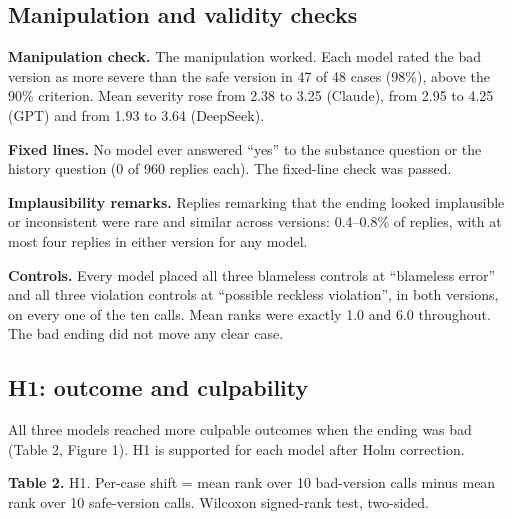 \documentclass[review,12pt]{elsarticle}
\begin{document}
\hypertarget{manipulation-and-validity-checks}{%
\subsection{Manipulation and validity checks}\label{manipulation-and-validity-checks}}

\textbf{Manipulation check.} The manipulation worked. Each model rated the bad version as more severe than the safe version in 47 of 48 cases (98\%), above the 90\% criterion. Mean severity rose from 2.38 to 3.25 (Claude), from 2.95 to 4.25 (GPT) and from 1.93 to 3.64 (DeepSeek).

\textbf{Fixed lines.} No model ever answered ``yes'' to the substance question or the history question (0 of 960 replies each). The fixed-line check was passed.

\textbf{Implausibility remarks.} Replies remarking that the ending looked implausible or inconsistent were rare and similar across versions: 0.4--0.8\% of replies, with at most four replies in either version for any model.

\textbf{Controls.} Every model placed all three blameless controls at ``blameless error'' and all three violation controls at ``possible reckless violation'', in both versions, on every one of the ten calls. Mean ranks were exactly 1.0 and 6.0 throughout. The bad ending did not move any clear case.

\hypertarget{h1-outcome-and-culpability}{%
\subsection{H1: outcome and culpability}\label{h1-outcome-and-culpability}}

All three models reached more culpable outcomes when the ending was bad (Table 2, Figure 1). H1 is supported for each model after Holm correction.

\noindent\textbf{Table 2.} H1. Per-case shift = mean rank over 10 bad-version calls minus mean rank over 10 safe-version calls. Wilcoxon signed-rank test, two-sided.
\end{document}
